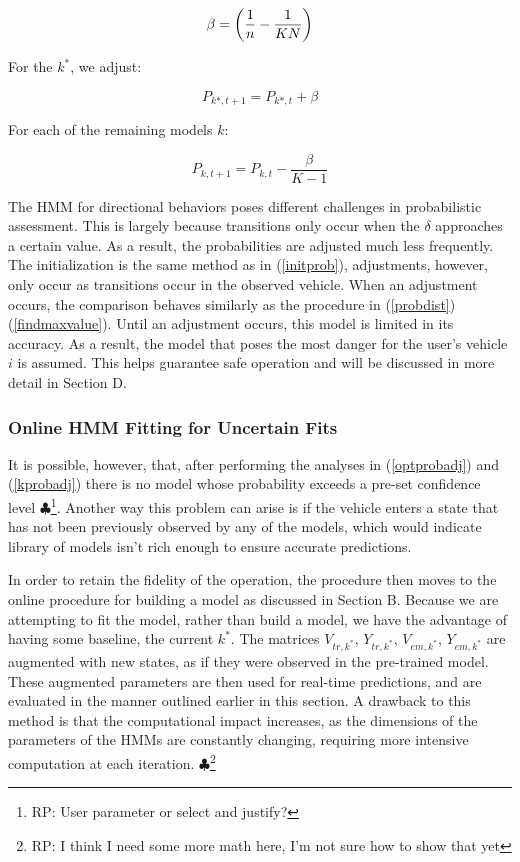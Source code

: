 \documentclass[conference]{IEEEtran}
\newcommand\RP[1]{$\clubsuit$\footnote{RP: #1}}
\begin{document}
\begin{equation}
    \beta = \bigg{(}\frac{1}{n}-\frac{1}{KN}\bigg{)}
\end{equation}

For the $k^{*}$, we adjust:

\begin{equation} \label{optprobadj}
    P_{k*,t+1} = P_{k*,t} + \beta
\end{equation}

For each of the remaining models $k$:

\begin{equation} \label{kprobadj}
    P_{k,t+1} = P_{k,t} - \frac{\beta}{K-1}
\end{equation}

The HMM for directional behaviors poses different challenges in probabilistic assessment. This is largely because transitions only occur when the $\delta$ approaches a certain value. As a result, the probabilities are adjusted much less frequently. The initialization is the same method as in (\ref{initprob}), adjustments, however, only occur as transitions occur in the observed vehicle. When an adjustment occurs, the comparison behaves similarly as the procedure in (\ref{probdist}) (\ref{findmaxvalue}). Until an adjustment occurs, this model is limited in its accuracy. As a result, the model that poses the most danger for the user's vehicle $i$ is assumed. This helps guarantee safe operation and will be discussed in more detail in Section D.



\subsubsection{Online HMM Fitting for Uncertain Fits}
It is possible, however, that, after performing the analyses in (\ref{optprobadj}) and (\ref{kprobadj}) there is no model whose probability exceeds a pre-set confidence level \RP{User parameter or select and justify?}. Another way this problem can arise is if the vehicle enters a state that has not been previously observed by any of the models, which would indicate library of models isn't rich enough to ensure accurate predictions.

In order to retain the fidelity of the operation, the procedure then moves to the online procedure for building a model as discussed in Section B. Because we are attempting to fit the model, rather than build a model, we have the advantage of having some baseline, the current $k^{*}$. The matrices $V_{tr,k^{*}}$, $Y_{tr,k^{*}}$, $V_{em,k^{*}}$, $Y_{em,k^{*}}$ are augmented with new states, as if they were observed in the pre-trained model. These augmented parameters are then used for real-time predictions, and are evaluated in the manner outlined earlier in this section. A drawback to this method is that the computational impact increases, as the dimensions of the parameters of the HMMs are constantly changing, requiring more intensive computation at each iteration. \RP{I think I need some more math here, I'm not sure how to show that yet}
\end{document}
